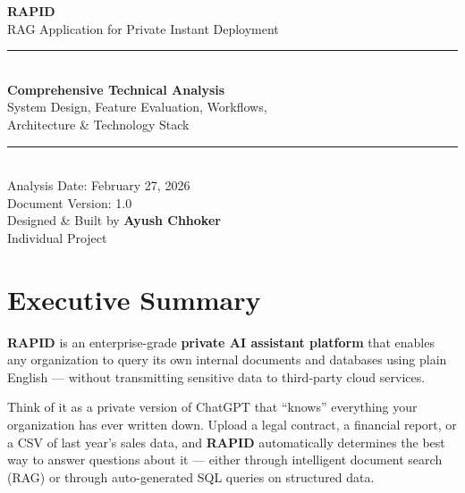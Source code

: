 \documentclass[12pt, a4paper, oneside]{report}
\newcommand{\rapidsys}{\textbf{\color{rapidblue}RAPID}}
\begin{document}
\begin{titlepage}
  \pagecolor{rapidblue}
  \color{white}
  \vspace*{2cm}
  \begin{center}
    {\fontsize{48}{54}\selectfont\bfseries\sffamily RAPID}\\[8pt]
    {\Large\sffamily RAG Application for Private Instant Deployment}\\[2cm]
    \rule{0.6\linewidth}{0.8pt}\\[1.5cm]
    {\LARGE\sffamily\bfseries Comprehensive Technical Analysis}\\[0.5cm]
    {\large\sffamily System Design, Feature Evaluation, Workflows,}\\
    {\large\sffamily Architecture \& Technology Stack}\\[2.5cm]
    \rule{0.6\linewidth}{0.4pt}\\[1cm]
    {\large\sffamily Analysis Date: February 27, 2026}\\[0.4cm]
    {\large\sffamily Document Version: 1.0}\\[2cm]
    {\normalsize\sffamily\color{white!80}
      Designed \& Built by \textbf{Ayush Chhoker}\\[0.3cm]
      Individual Project
    }
  \end{center}
  \vfill
\end{titlepage}
\nopagecolor

\tableofcontents
\newpage

\chapter{Executive Summary}

\rapidsys{} is an enterprise-grade \textbf{private AI assistant platform} that enables any
organization to query its own internal documents and databases using plain English — without
transmitting sensitive data to third-party cloud services.

Think of it as a private version of ChatGPT that ``knows'' everything your organization has
ever written down. Upload a legal contract, a financial report, or a CSV of last year's
sales data, and \rapidsys{} automatically determines the best way to answer questions about
it — either through intelligent document search (RAG) or through auto-generated SQL queries
on structured data.
\end{document}
